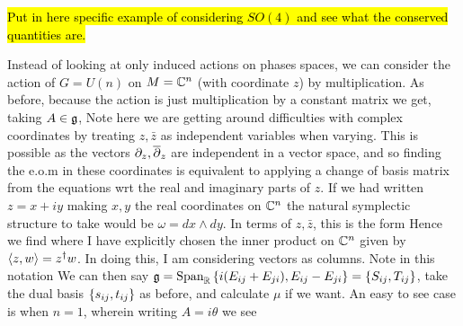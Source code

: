 \documentclass{article}
\begin{document}
\begin{example}
\hl{Put in here specific example of considering $SO(4)$ and see what the conserved quantities are.} 
\end{example}

\begin{example}
Instead of looking at only induced actions on phases spaces, we can consider the action of $G = U(n)$ on $M = \mathbb{C}^n$ (with coordinate $z$) by multiplication. As before, because the action is just multiplication by a constant matrix we get, taking $A \in \mathfrak{g}$, 
Note here we are getting around difficulties with complex coordinates by treating $z,\bar{z}$ as independent variables when varying. This is possible as the vectors $\partial_z, \overline{\partial}_z$ are independent in a vector space, and so finding the e.o.m in these coordinates is equivalent to applying a change of basis matrix from the equations wrt the real and imaginary parts of $z$. If we had written $z=x+iy$ making $x,y$ the real coordinates on $\mathbb{C}^n$ the natural symplectic structure to take would be $\omega = dx \wedge dy$. In terms of $z,\bar{z}$, this is the form 
Hence we find 
where I have explicitly chosen the inner product on $\mathbb{C}^n$ given by $\left\langle z,w \right\rangle = z^\dagger w$. In doing this, I am considering vectors as columns. Note in this notation 
We can then say $\mathfrak{g} = \operatorname{Span}_{\mathbb{R}}\left\{ i(E_{ij}+E_{ji}), E_{ij}-E_{ji} \right\} = \left\{ S_{ij},T_{ij} \right\}$, take the dual basis $\left\{ s_{ij},t_{ij} \right\}$ as before, and calculate $\mu$ if we want. An easy to see case is when $n=1$, wherein writing $A = i\theta$ we see 
\end{example}
\end{document}
